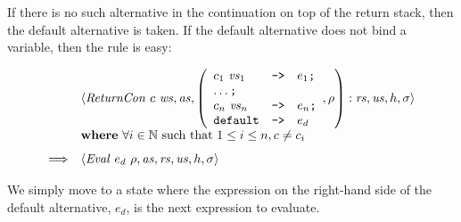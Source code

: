 If there is no such alternative in the continuation on top of the return stack, then the default alternative is taken. If the default alternative does not bind a variable, then the rule is easy:
\begin{mdframed}
\begin{equation}
\begin{array}{cl}
 & \langle \mathit{ReturnCon}~c~\mathit{ws}, \mathit{as}, \left(\begin{array}{lcl}
 c_1~\mathit{vs}_1 & \texttt{->} & e_1 \texttt{;} \\
 \multicolumn{3}{l}{\ldots \texttt{;}} \\
 c_n~\mathit{vs}_n & \texttt{->} & e_n \texttt{;} \\
 \texttt{default} & \texttt{->} & e_d
 \end{array}, \rho\right) : \mathit{rs}, \mathit{us}, h, \sigma \rangle \\
 & \mathbf{where}~\forall i \in \mathbb{N}~\text{such that}~1 \leq i \leq n, c \neq c_i \\[0.25cm]
\Longrightarrow & \langle \mathit{Eval}~e_d~\rho, \mathit{as}, \mathit{rs}, \mathit{us}, h, \sigma \rangle
\end{array}
\end{equation}
\end{mdframed}
We simply move to a state where the expression on the right-hand side of the default alternative, $e_d$, is the next expression to evaluate.

